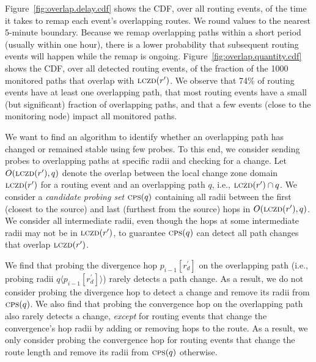 
Figure~\ref{fig:overlap.delay.cdf} shows the CDF, over all routing
events, of the time it takes to remap each event's overlapping
routes.  We round values to the nearest 5-minute boundary.  Because
we remap overlapping paths within a short period (usually within one
hour), there is a lower probability that subsequent routing events
will happen while the remap is ongoing.
Figure~\ref{fig:overlap.quantity.cdf} shows the CDF, over all
detected routing events, of the fraction of the 1000 monitored paths
that overlap with $\mathrm{\textsc{lczd}}(r')$.  We observe that 74\% of routing
events have at least one overlapping path, that most routing events
have a small (but significant) fraction of overlapping paths, and
that a few events (close to the monitoring node) impact all
monitored paths.

  We want to find an
algorithm to identify whether an overlapping path has changed or
remained stable using few probes.  To this end, we consider sending
probes to overlapping paths at specific radii and checking for
a change.  Let $O(\mathrm{\textsc{lczd}}(r'), q)$ denote the overlap between the
local change zone domain $\mathrm{\textsc{lczd}}(r')$ for a routing event and an
overlapping path $q$, i.e., $\mathrm{\textsc{lczd}}(r')\cap{}q$.  We consider
a \emph{candidate probing set} $\mathrm{\textsc{cps}}(q)$ containing all radii
between the first (closest to the source) and last (furthest from
the source) hops in $O(\mathrm{\textsc{lczd}}(r'), q)$.  We consider all intermediate
radii, even though the hops at some intermediate radii may not be in
$\mathrm{\textsc{lczd}}(r')$,\footnotemark{} to guarantee $\mathrm{\textsc{cps}}(q)$ can detect all
path changes that overlap $\mathrm{\textsc{lczd}}(r')$.


We find that probing the divergence hop $p_{i-1}[r^\prime_d]$ on the
overlapping path (i.e., probing radii $q\langle p_{i-1}[r^\prime_d]
\rangle$) rarely detects a path change.  As a result, we do not
consider probing the divergence hop to detect a change and remove
its radii from $\mathrm{\textsc{cps}}(q)$.\footnotemark{}  We also find that probing
the convergence hop on the overlapping path also rarely detects
a change, \emph{except} for routing events that change the
convergence's hop radii by adding or removing hops to the route.  As
a result, we only consider probing the convergence hop for routing
events that change the route length and remove its radii from
$\mathrm{\textsc{cps}}(q)$ otherwise.

